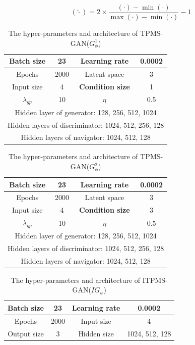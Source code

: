 \documentclass[preprint,review,12pt,authoryear]{elsarticle}
\begin{document}
\begin{equation}
(\hat{\cdot}) = 2 \times \frac{(\cdot) - \min(\cdot)}{\max(\cdot) - \min(\cdot)} - 1  
\end{equation}

\begin{table}
    \centering
        \caption{The hyper-parameters and architecture of TPMS-GAN($G_\phi^1$) }
    \begin{tabular}{|c|c|c|c|} \hline  
         Batch size&  23&  Learning rate& 0.0002\\ \hline  
         Epochs&  2000&  Latent space& 3\\ \hline  
         Input size&  4&  \textbf{Condition size}& 1\\ \hline
 $\lambda_{gp}$& 10& $\eta$&0.5\\\hline \hline  
 \multicolumn{4}{|c|}{Hidden layer of generator: 128, 256, 512, 1024}\\ \hline  
 \multicolumn{4}{|c|}{Hidden layers of discriminator: 1024, 512, 256, 128}\\ \hline  
 \multicolumn{4}{|c|}{Hidden layers of navigator: 1024, 512, 128}\\ \hline 
    \end{tabular}
    \label{tab:s2}
\end{table}

\begin{table}
    \centering
        \caption{The hyper-parameters and architecture of TPMS-GAN($G_\phi^2$) }
    \begin{tabular}{|c|c|c|c|} \hline  
         Batch size&  23&  Learning rate& 0.0002\\ \hline  
         Epochs&  2000&  Latent space& 3\\ \hline  
         Input size&  4&  \textbf{Condition size}& 3\\ \hline
 $\lambda_{gp}$& 10& $\eta$&0.5\\\hline \hline  
 \multicolumn{4}{|c|}{Hidden layer of generator: 128, 256, 512, 1024}\\ \hline  
 \multicolumn{4}{|c|}{Hidden layers of discriminator: 1024, 512, 256, 128}\\ \hline  
 \multicolumn{4}{|c|}{Hidden layers of navigator: 1024, 512, 128}\\ \hline 
    \end{tabular}
    \label{tab:s3}
\end{table}

\begin{table}
    \centering
        \caption{The hyper-parameters and architecture of ITPMS-GAN($IG_\psi$) }
    \begin{tabular}{|c|c|c|c|} \hline  
         Batch size&  23&  Learning rate& 0.0002\\ \hline  
         Epochs&  2000&  Input size & 4\\ \hline  
         Output size&  3& Hidden size & 1024, 512, 128\\ \hline   

    \end{tabular}
    \label{tab:s4}
\end{table}
\end{document}
